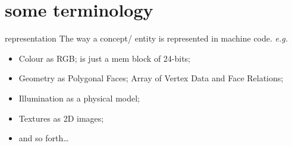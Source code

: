 \documentclass[aspectratio=169,xcolor={dvipsnames,svgnames}]{beamer}
\begin{document}
\section{some terminology}
\label{sec:org430d7f5}

\begin{frame}[label={sec:org44193fa}]{representation}
The way a concept/ entity is represented in machine
code. \emph{e.g.}

\begin{itemize}
\item Colour as \alert{RGB}; is just a mem block of 24-bits;
\item Geometry as \alert{Polygonal Faces}; Array of Vertex Data
and Face Relations;
\item Illumination as a physical model;
\item Textures as 2D images;
\item and so forth\ldots
\end{itemize}
\end{frame}
\end{document}
